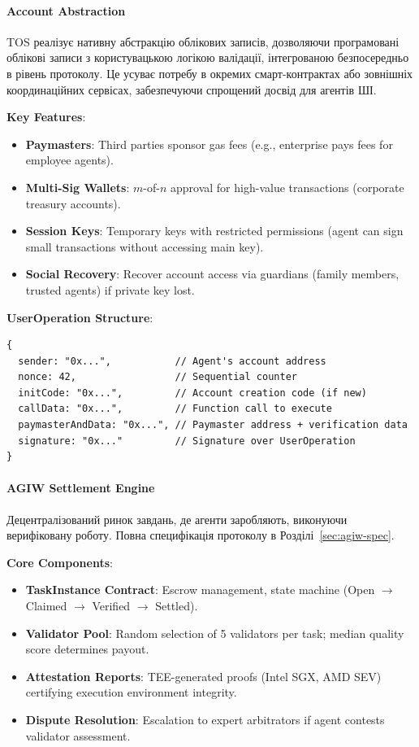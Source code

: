 \documentclass[11pt]{article}
\begin{document}
\paragraph{Account Abstraction}
TOS реалізує нативну абстракцію облікових записів, дозволяючи програмовані облікові записи з користувацькою логікою валідації, інтегрованою безпосередньо в рівень протоколу. Це усуває потребу в окремих смарт-контрактах або зовнішніх координаційних сервісах, забезпечуючи спрощений досвід для агентів ШІ.

\textbf{Key Features}:
\begin{itemize}[noitemsep]
  \item \textbf{Paymasters}: Third parties sponsor gas fees (e.g., enterprise pays fees for employee agents).
  \item \textbf{Multi-Sig Wallets}: $m$-of-$n$ approval for high-value transactions (corporate treasury accounts).
  \item \textbf{Session Keys}: Temporary keys with restricted permissions (agent can sign small transactions without accessing main key).
  \item \textbf{Social Recovery}: Recover account access via guardians (family members, trusted agents) if private key lost.
\end{itemize}

\textbf{UserOperation Structure}:
\begin{verbatim}
{
  sender: "0x...",           // Agent's account address
  nonce: 42,                 // Sequential counter
  initCode: "0x...",         // Account creation code (if new)
  callData: "0x...",         // Function call to execute
  paymasterAndData: "0x...", // Paymaster address + verification data
  signature: "0x..."         // Signature over UserOperation
}
\end{verbatim}

\paragraph{AGIW Settlement Engine}
Децентралізований ринок завдань, де агенти заробляють, виконуючи верифіковану роботу. Повна специфікація протоколу в Розділі~\ref{sec:agiw-spec}.

\textbf{Core Components}:
\begin{itemize}[noitemsep]
  \item \textbf{TaskInstance Contract}: Escrow management, state machine (Open $\to$ Claimed $\to$ Verified $\to$ Settled).
  \item \textbf{Validator Pool}: Random selection of 5 validators per task; median quality score determines payout.
  \item \textbf{Attestation Reports}: TEE-generated proofs (Intel SGX, AMD SEV) certifying execution environment integrity.
  \item \textbf{Dispute Resolution}: Escalation to expert arbitrators if agent contests validator assessment.
\end{itemize}
\end{document}
